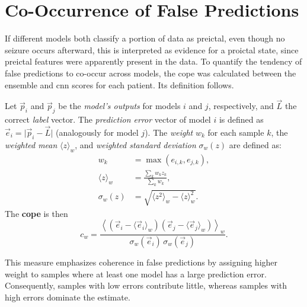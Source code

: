 \section{Co-Occurrence of False Predictions} \label{sec:co-occurrence-of-false-predictions}
If different models both classify a portion of data as preictal, even though no seizure occurs afterward, this is interpreted as evidence for a proictal state, since preictal features were apparently present in the data.
To quantify the tendency of false predictions to co-occur across models, the \gls{cope} \parencite{muller_coherent_2022} was calculated between the ensemble and \gls{cnn} scores for each patient.
Its definition follows.

Let $\vec{p}_i$ and $\vec{p}_j$ be the \textit{model's outputs} for models $i$ and $j$, respectively, and $\vec{L}$ the correct \textit{label} vector.
The \textit{prediction error} vector of model $i$ is defined as $\vec{e}_i=\lvert\vec{p}_i-\vec{L}\rvert$ (analogously for model $j$).
The \textit{weight} $w_k$ for each sample $k$, the \textit{weighted mean} $\langle z\rangle_w$, and \textit{weighted standard deviation} $\sigma_w(z)$ are defined as:
\begin{equation} \label{eq:cope-helpers}
    \begin{aligned}
        w_k &= \max(e_{i,k},e_{j,k}),\\
        \langle z\rangle_w &= \frac{\sum_k w_k z_k}{\sum_k w_k},\\
        \sigma_w(z) &= \sqrt{\langle z^2\rangle_w-\langle z\rangle_w^2}.
    \end{aligned}
\end{equation}
The \textbf{\gls{cope}} is then
\begin{equation} \label{eq:cope}
    c_w=\frac{\left\langle\left(\vec{e}_i-\langle \vec{e}_i\rangle_w\right)\left(\vec{e}_j-\langle \vec{e}_j\rangle_w\right)\right\rangle_w}
    {\sigma_w(\vec{e}_i)\,\sigma_w(\vec{e}_j)}.
\end{equation}

This measure emphasizes coherence in false predictions by assigning higher weight to samples where at least one model has a large prediction error.
Consequently, samples with low errors contribute little, whereas samples with high errors dominate the estimate.